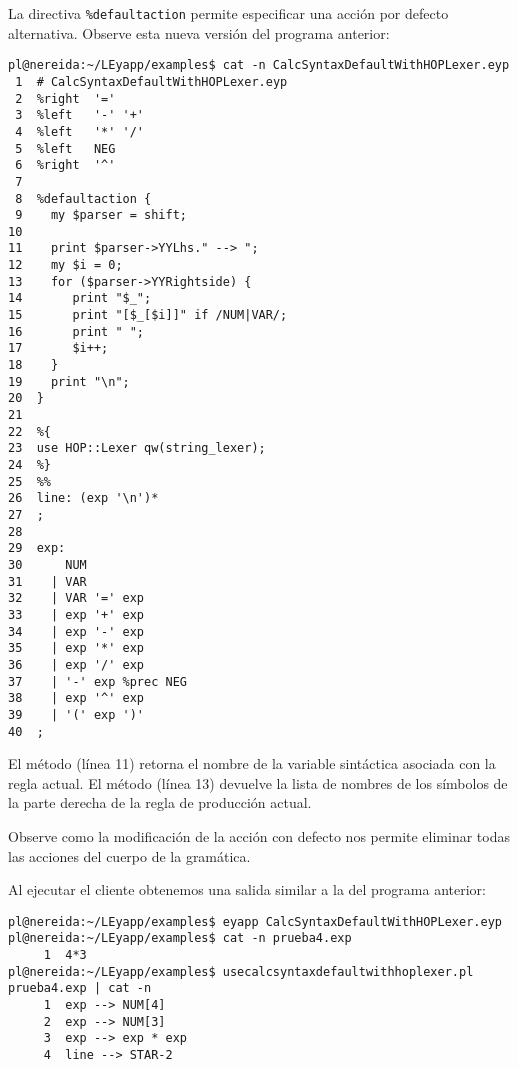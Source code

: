 
La directiva \verb|%defaultaction| permite especificar una acción por defecto
alternativa. Observe esta nueva versión del programa anterior:

\begin{verbatim}
pl@nereida:~/LEyapp/examples$ cat -n CalcSyntaxDefaultWithHOPLexer.eyp
 1  # CalcSyntaxDefaultWithHOPLexer.eyp
 2  %right  '='
 3  %left   '-' '+'
 4  %left   '*' '/'
 5  %left   NEG
 6  %right  '^'
 7
 8  %defaultaction {
 9    my $parser = shift;
10
11    print $parser->YYLhs." --> ";
12    my $i = 0;
13    for ($parser->YYRightside) {
14       print "$_";
15       print "[$_[$i]]" if /NUM|VAR/;
16       print " ";
17       $i++;
18    }
19    print "\n";
20  }
21
22  %{
23  use HOP::Lexer qw(string_lexer);
24  %}
25  %%
26  line: (exp '\n')*
27  ;
28
29  exp:
30      NUM
31    | VAR
32    | VAR '=' exp
33    | exp '+' exp
34    | exp '-' exp
35    | exp '*' exp
36    | exp '/' exp
37    | '-' exp %prec NEG
38    | exp '^' exp
39    | '(' exp ')'
40  ;
\end{verbatim}

El método   (línea 11) retorna el nombre de la variable
sintáctica asociada con la regla actual.
El método  (línea 13)
devuelve la lista de nombres de los símbolos de la parte 
derecha de la regla de producción actual.

Observe como la modificación de la acción con defecto
nos permite eliminar todas las acciones del cuerpo de la gramática.

Al ejecutar el cliente obtenemos una salida similar a la del programa anterior:
\begin{verbatim}
pl@nereida:~/LEyapp/examples$ eyapp CalcSyntaxDefaultWithHOPLexer.eyp
pl@nereida:~/LEyapp/examples$ cat -n prueba4.exp
     1  4*3
pl@nereida:~/LEyapp/examples$ usecalcsyntaxdefaultwithhoplexer.pl prueba4.exp | cat -n
     1  exp --> NUM[4]
     2  exp --> NUM[3]
     3  exp --> exp * exp
     4  line --> STAR-2
\end{verbatim}


